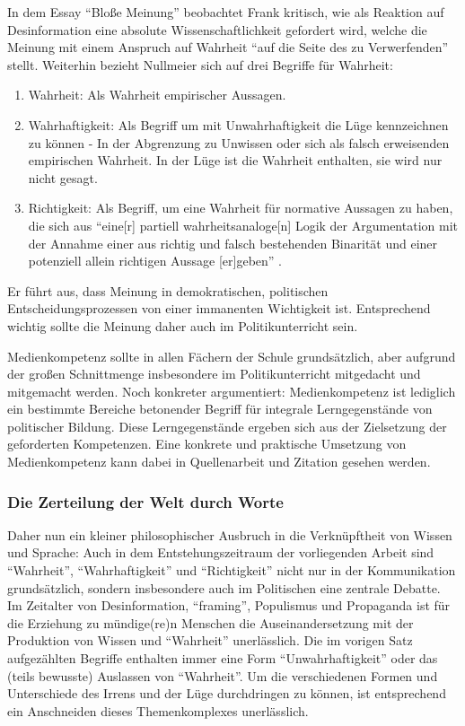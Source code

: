 In dem Essay \enquote{Bloße Meinung} beobachtet Frank \textcite[]{Nullmeier2019} kritisch, wie als Reaktion auf Desinformation eine absolute Wissenschaftlichkeit gefordert wird, welche die Meinung mit einem Anspruch auf Wahrheit \enquote{auf die Seite des zu Verwerfenden} \autocite{Nullmeier2019} stellt.  Weiterhin bezieht Nullmeier sich auf drei Begriffe für Wahrheit:
\begin{enumerate}
    \item Wahrheit: Als Wahrheit empirischer Aussagen.
    \item Wahrhaftigkeit: Als Begriff um mit Unwahrhaftigkeit die Lüge kennzeichnen zu können - In der Abgrenzung zu Unwissen oder sich als falsch erweisenden empirischen Wahrheit. In der Lüge ist die Wahrheit enthalten, sie wird nur nicht gesagt. 
    \item Richtigkeit: Als Begriff, um eine Wahrheit für normative Aussagen zu haben, die sich aus \enquote{eine[r] partiell wahrheitsanaloge[n] Logik der Argumentation mit der Annahme einer aus richtig und falsch bestehenden Binarität und einer potenziell allein richtigen Aussage [er]geben} \autocite{Nullmeier2019}.
\end{enumerate}

Er führt aus, dass Meinung in demokratischen, politischen Entscheidungsprozessen von einer immanenten Wichtigkeit ist. Entsprechend wichtig sollte die Meinung daher auch im Politikunterricht sein.


Medienkompetenz sollte in allen Fächern der Schule grundsätzlich, aber aufgrund der großen Schnittmenge insbesondere im Politikunterricht mitgedacht und mitgemacht werden. 
Noch konkreter argumentiert: Medienkompetenz ist lediglich ein bestimmte Bereiche betonender Begriff für integrale Lerngegenstände von politischer Bildung. Diese Lerngegenstände ergeben sich aus der Zielsetzung der geforderten Kompetenzen. Eine konkrete und praktische Umsetzung von Medienkompetenz kann dabei in Quellenarbeit und Zitation gesehen werden.
 
\subsubsection{Die Zerteilung der Welt durch Worte}
Daher nun ein kleiner philosophischer Ausbruch in die Verknüpftheit von Wissen und Sprache: Auch in dem Entstehungszeitraum der vorliegenden Arbeit sind \enquote{Wahrheit}, \enquote{Wahrhaftigkeit} und \enquote{Richtigkeit} nicht nur in der Kommunikation grundsätzlich, sondern insbesondere auch im Politischen eine zentrale Debatte. 
Im Zeitalter von Desinformation, \enquote{framing}, Populismus und Propaganda ist für die Erziehung zu mündige(re)n Menschen die Auseinandersetzung mit der Produktion von Wissen und \enquote{Wahrheit} unerlässlich. Die im vorigen Satz aufgezählten Begriffe enthalten immer eine Form \enquote{Unwahrhaftigkeit} oder das (teils bewusste) Auslassen von \enquote{Wahrheit}. Um die verschiedenen Formen und Unterschiede des Irrens und der Lüge durchdringen zu können, ist entsprechend ein Anschneiden dieses Themenkomplexes unerlässlich.  

